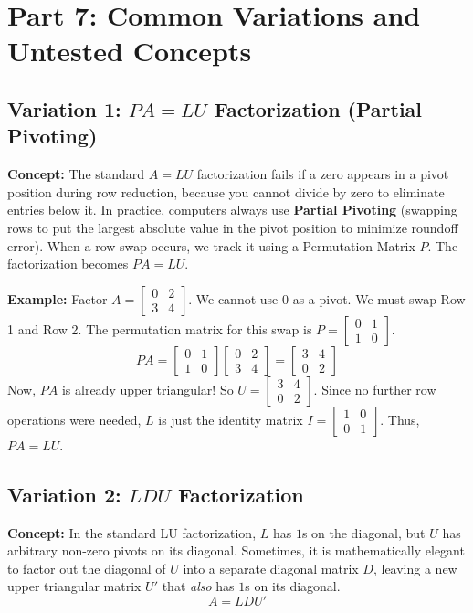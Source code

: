 \documentclass[11pt]{article}
\begin{document}
\newpage
\section{Part 7: Common Variations and Untested Concepts}

\subsection{Variation 1: $PA = LU$ Factorization (Partial Pivoting)}
\textbf{Concept:} The standard $A=LU$ factorization fails if a zero appears in a pivot position during row reduction, because you cannot divide by zero to eliminate entries below it. In practice, computers always use \textbf{Partial Pivoting} (swapping rows to put the largest absolute value in the pivot position to minimize roundoff error). 
When a row swap occurs, we track it using a Permutation Matrix $P$. The factorization becomes $PA = LU$.

\textbf{Example:} Factor $A = \begin{bmatrix} 0 & 2 \\ 3 & 4 \end{bmatrix}$.
We cannot use $0$ as a pivot. We must swap Row 1 and Row 2.
The permutation matrix for this swap is $P = \begin{bmatrix} 0 & 1 \\ 1 & 0 \end{bmatrix}$.
\[ PA = \begin{bmatrix} 0 & 1 \\ 1 & 0 \end{bmatrix} \begin{bmatrix} 0 & 2 \\ 3 & 4 \end{bmatrix} = \begin{bmatrix} 3 & 4 \\ 0 & 2 \end{bmatrix} \]
Now, $PA$ is already upper triangular! So $U = \begin{bmatrix} 3 & 4 \\ 0 & 2 \end{bmatrix}$.
Since no further row operations were needed, $L$ is just the identity matrix $I = \begin{bmatrix} 1 & 0 \\ 0 & 1 \end{bmatrix}$.
Thus, $PA = LU$.

\subsection{Variation 2: $LDU$ Factorization}
\textbf{Concept:} In the standard LU factorization, $L$ has $1$s on the diagonal, but $U$ has arbitrary non-zero pivots on its diagonal. Sometimes, it is mathematically elegant to factor out the diagonal of $U$ into a separate diagonal matrix $D$, leaving a new upper triangular matrix $U'$ that \textit{also} has $1$s on its diagonal.
\[ A = LDU' \]
\end{document}
